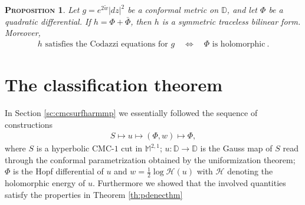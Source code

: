 \documentclass[a4paper,11pt,openright,twoside]{book}
\renewcommand{\iff}{\Leftrightarrow}
\newcommand{\M}{\mathbb{M}^{2,1}}
\newcommand{\1}{\mathds{1}}
\theoremstyle{plain}
\newtheorem{prop}[thm]{\textsc{Proposition}}
\theoremstyle{definition}
\theoremstyle{remark}
\begin{document}
\begin{prop}\label{prop:codazziqd}
	Let $g=e^{2\tilde w}|dz|^2$ be a conformal metric on $\mathbb{D}$, and let $\Phi$ be a quadratic differential. If $h=\Phi+\bar\Phi$, then $h$ is a symmetric traceless bilinear form. Moreover,
	\begin{align*}
		h \text{ satisfies the Codazzi equations for } g
		\quad \iff \quad
		\Phi \text{ is holomorphic}
		\ .
	\end{align*}
\end{prop}
\section{The classification theorem}
In Section \ref{sc:cmcsurfharmmp} we essentially followed the sequence of constructions
\begin{align}\label{eq:infrel}
S\longmapsto u\longmapsto (\Phi,w)\longmapsto \Phi,
\end{align}
where $S$ is a hyperbolic CMC-$1$ cut in $\M$; $u:\mathbb{D}\to \mathbb{D}$ is the Gauss map of $S$ read through the conformal parametrization obtained by the uniformization theorem; $\Phi$ is the Hopf differential of $u$ and $w=\frac{1}{2}\log\mathcal{H}(u)$ with $\mathcal{H}$ denoting the holomorphic energy of $u$. Furthermore we showed that the involved quantities satisfy the properties in Theorem \ref{th:pdenecthm}\\
\end{document}
